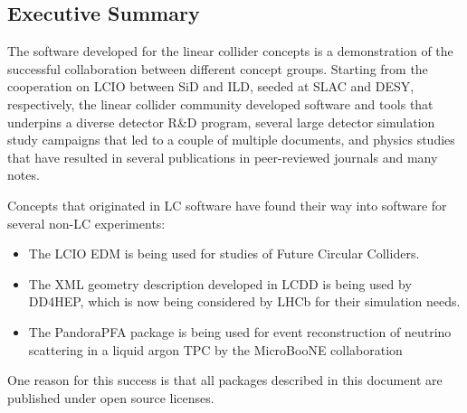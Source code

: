 \subsection{Executive Summary}

The software developed for the linear collider concepts is a demonstration of the successful collaboration between different concept groups. Starting from the cooperation on LCIO between SiD and ILD, seeded at SLAC and DESY, respectively, the linear collider community developed software and tools that underpins a diverse detector R\&D program, several large detector simulation study campaigns that led to a couple of multiple documents, and physics studies that have resulted in several publications in peer-reviewed journals and many notes.

Concepts that originated in LC software have found their way into software for several non-LC experiments:
\begin{itemize}
 	\item The LCIO EDM is being used for studies of Future Circular Colliders.
	\item The XML geometry description developed in LCDD is being used by DD4HEP, which is now being considered by LHCb for their simulation needs.
	\item The PandoraPFA package is being used for event reconstruction of neutrino scattering in a liquid argon TPC by the MicroBooNE collaboration
\end{itemize}

One reason for this success is that all packages described in this document are published under open source licenses.
